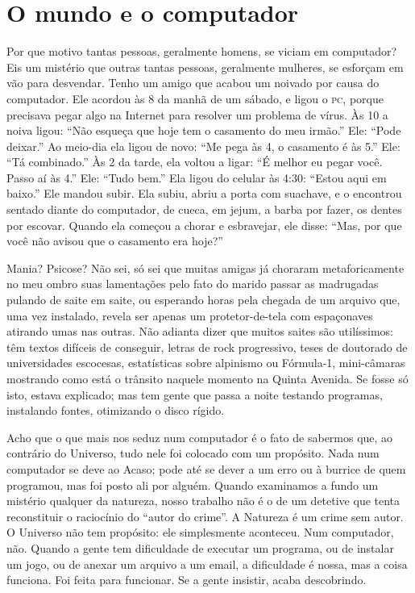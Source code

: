 \chapter{O mundo e o computador}

Por que motivo tantas pessoas, geralmente homens, se viciam em
computador? Eis um mistério que outras tantas pessoas, geralmente
mulheres, se esforçam em vão para desvendar. Tenho um amigo que
acabou um noivado por causa do computador. Ele acordou às 8 da manhã
de um sábado, e ligou o \textsc{pc}, porque precisava pegar algo na Internet
para resolver um problema de vírus. Às 10 a noiva ligou: “Não esqueça
que hoje tem o casamento do meu irmão.” Ele: “Pode deixar.”  Ao
meio-dia ela ligou de novo: “Me pega às 4, o casamento é às 5.” Ele:
“Tá combinado.”  Às 2 da tarde, ela voltou a ligar: “É melhor eu
pegar você. Passo aí às 4.” Ele: “Tudo bem.” Ela ligou do celular às
4:30: “Estou aqui em baixo.” Ele mandou subir. Ela subiu, abriu a
porta com suachave, e o encontrou sentado diante do computador, de
cueca, em jejum, a barba por fazer, os dentes por escovar. Quando ela
começou a chorar e esbravejar, ele disse: “Mas, por que você não
avisou que o casamento era hoje?”

Mania?  Psicose? Não sei, só sei que muitas amigas já choraram
metaforicamente no meu ombro suas lamentações pelo fato do marido
passar as madrugadas pulando de saite em saite, ou esperando horas
pela chegada de um arquivo que, uma vez instalado, revela ser apenas
um protetor-de-tela com espaçonaves atirando umas nas outras.  Não
adianta dizer que muitos saites são utilíssimos: têm textos difíceis
de conseguir, letras de rock progressivo, teses de doutorado de
universidades escocesas, estatísticas sobre alpinismo ou Fórmula-1,
mini-câmaras mostrando como está o trânsito naquele momento na Quinta
Avenida. Se fosse só isto, estava explicado; mas tem gente que passa
a noite testando programas, instalando fontes, otimizando o disco
rígido.

Acho que o que mais nos seduz num computador é o fato de sabermos que,
ao contrário do Universo, tudo nele foi colocado com um propósito.
Nada num computador se deve ao Acaso; pode até se dever a um erro ou
à burrice de quem programou, mas foi posto ali por alguém. Quando
examinamos a fundo um mistério qualquer da natureza, nosso trabalho
não é o de um detetive que tenta reconstituir o raciocínio do “autor
do crime”. A Natureza é um crime sem autor. O Universo não tem
propósito: ele simplesmente aconteceu. Num computador, não. Quando a
gente tem dificuldade de executar um programa, ou de instalar um
jogo, ou de anexar um arquivo a um email, a dificuldade é nossa, mas
a coisa funciona. Foi feita para funcionar. Se a gente insistir,
acaba descobrindo.

